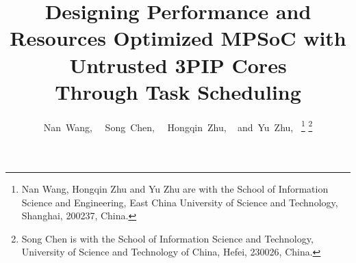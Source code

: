 \documentclass[10pt,journal]{IEEEtran}
\begin{document}
%
\title{Designing Performance and Resources Optimized MPSoC with Untrusted 3PIP Cores\\ Through Task Scheduling}
%
%
%
%

\author{Nan~Wang,~
        ~Song~Chen,~
        ~Hongqin~Zhu, ~
        and~Yu~Zhu,~
\thanks{Nan Wang, Hongqin Zhu and Yu Zhu are with the School of Information Science and Engineering, East China University of Science and Technology, Shanghai, 200237, China.}%
\thanks{Song Chen is with the School of Information Science and Technology, University of Science and Technology of China, Hefei, 230026, China.}
}
\end{document}
